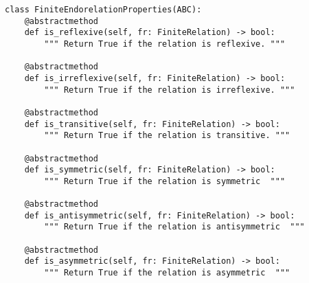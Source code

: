 \par\begin{minipage}{61ex}
\begin{verbatim}
class FiniteEndorelationProperties(ABC):
    @abstractmethod
    def is_reflexive(self, fr: FiniteRelation) -> bool:
        """ Return True if the relation is reflexive. """

    @abstractmethod
    def is_irreflexive(self, fr: FiniteRelation) -> bool:
        """ Return True if the relation is irreflexive. """

    @abstractmethod
    def is_transitive(self, fr: FiniteRelation) -> bool:
        """ Return True if the relation is transitive. """

    @abstractmethod
    def is_symmetric(self, fr: FiniteRelation) -> bool:
        """ Return True if the relation is symmetric  """

    @abstractmethod
    def is_antisymmetric(self, fr: FiniteRelation) -> bool:
        """ Return True if the relation is antisymmetric  """

    @abstractmethod
    def is_asymmetric(self, fr: FiniteRelation) -> bool:
        """ Return True if the relation is asymmetric  """
\end{verbatim}
\end{minipage}\par